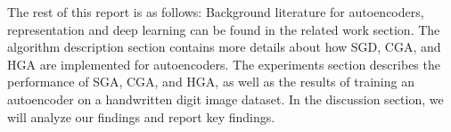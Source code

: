 The rest of this report is as follows: Background literature for autoencoders, representation and deep learning can be found in the related work section. The algorithm description section contains more details about how SGD, CGA, and HGA are implemented for autoencoders. The experiments section describes the performance of SGA, CGA, and HGA, as well as the results of training an autoencoder on a handwritten digit image dataset. In the discussion section, we will analyze our findings and report key findings. 




